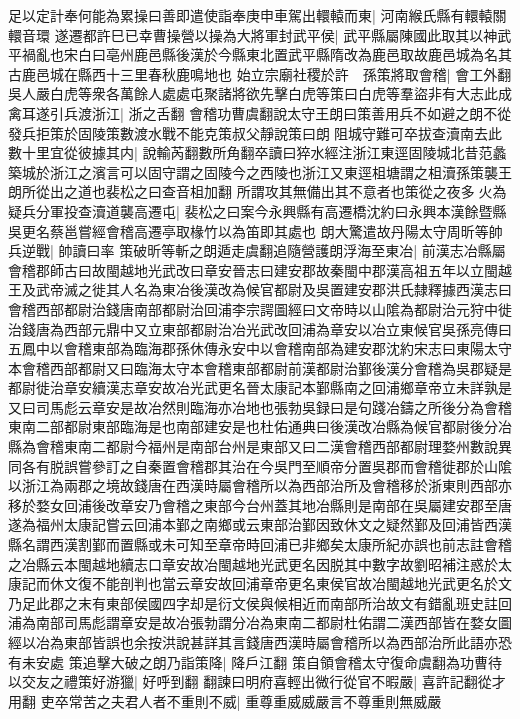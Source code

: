 足以定計奉何能為累操曰善即遣使詣奉庚申車駕出轘轅而東|{
	河南緱氏縣有轘轅關轘音環}
遂遷都許巳已幸曹操營以操為大將軍封武平侯|{
	武平縣屬陳國此取其以神武平禍亂也宋白曰亳州鹿邑縣後漢於今縣東北置武平縣隋改為鹿邑取故鹿邑城為名其古鹿邑城在縣西十三里春秋鹿鳴地也}
始立宗廟社稷於許　孫策將取會稽|{
	會工外翻}
吳人嚴白虎等衆各萬餘人處處屯聚諸將欲先擊白虎等策曰白虎等羣盜非有大志此成禽耳遂引兵渡浙江|{
	浙之舌翻}
會稽功曹虞翻說太守王朗曰策善用兵不如避之朗不從發兵拒策於固陵策數渡水戰不能克策叔父靜說策曰朗阻城守難可卒拔查瀆南去此數十里宜從彼據其内|{
	說輸芮翻數所角翻卒讀曰猝水經注浙江東逕固陵城北昔范蠡築城於浙江之濱言可以固守謂之固陵今之西陵也浙江又東逕柤塘謂之柤瀆孫策襲王朗所從出之道也裴松之曰查音柤加翻}
所謂攻其無備出其不意者也策從之夜多火為疑兵分軍投查瀆道襲高遷屯|{
	裴松之曰案今永興縣有高遷橋沈約曰永興本漢餘暨縣吳更名蔡邕嘗經會稽高遷亭取椽竹以為笛即其處也}
朗大驚遣故丹陽太守周昕等帥兵逆戰|{
	帥讀曰率}
策破昕等斬之朗遁走虞翻追隨營護朗浮海至東冶|{
	前漢志冶縣屬會稽郡師古曰故閩越地光武改曰章安晉志曰建安郡故秦閩中郡漢高祖五年以立閩越王及武帝滅之徙其人名為東冶後漢改為候官都尉及吳置建安郡洪氏隸釋據西漢志曰會稽西部都尉治錢唐南部都尉治回浦李宗諤圖經曰文帝時以山隂為都尉治元狩中徙治錢唐為西部元鼎中又立東部都尉治冶光武改回浦為章安以冶立東候官吳孫亮傳曰五鳳中以會稽東部為臨海郡孫休傳永安中以會稽南部為建安郡沈約宋志曰東陽太守本會稽西部都尉又曰臨海太守本會稽東部都尉前漢都尉治鄞後漢分會稽為吳郡疑是都尉徙治章安續漢志章安故冶光武更名晉太康記本鄞縣南之回浦鄉章帝立未詳孰是又曰司馬彪云章安是故冶然則臨海亦冶地也張勃吳録曰是句踐冶鑄之所後分為會稽東南二部都尉東部臨海是也南部建安是也杜佑通典曰後漢改冶縣為候官都尉後分冶縣為會稽東南二都尉今福州是南部台州是東部又曰二漢會稽西部都尉理婺州數說異同各有脱誤嘗參訂之自秦置會稽郡其治在今吳門至順帝分置吳郡而會稽徙郡於山隂以浙江為兩郡之境故錢唐在西漢時屬會稽所以為西部治所及會稽移於浙東則西部亦移於婺女回浦後改章安乃會稽之東部今台州蓋其地冶縣則是南部在吳屬建安郡至唐遂為福州太康記嘗云回浦本鄞之南鄉或云東部治鄞因致休文之疑然鄞及回浦皆西漢縣名謂西漢割鄞而置縣或未可知至章帝時回浦已非鄉矣太康所紀亦誤也前志註會稽之冶縣云本閩越地續志口章安故冶閩越地光武更名因脱其中數字故劉昭補注惑於太康記而休文復不能剖判也當云章安故回浦章帝更名東侯官故冶閩越地光武更名於文乃足此郡之末有東部侯國四字却是衍文侯與候相近而南部所治故文有錯亂班史註回浦為南部司馬彪謂章安是故冶張勃謂分冶為東南二都尉杜佑謂二漢西部皆在婺女圖經以冶為東部皆誤也余按洪說甚詳其言錢唐西漢時屬會稽所以為西部治所此語亦恐有未安處}
策追擊大破之朗乃詣策降|{
	降戶江翻}
策自領會稽太守復命虞翻為功曹待以交友之禮策好游獵|{
	好呼到翻}
翻諫曰明府喜輕出微行從官不暇嚴|{
	喜許記翻從才用翻}
吏卒常苦之夫君人者不重則不威|{
	重尊重威威嚴言不尊重則無威嚴}
